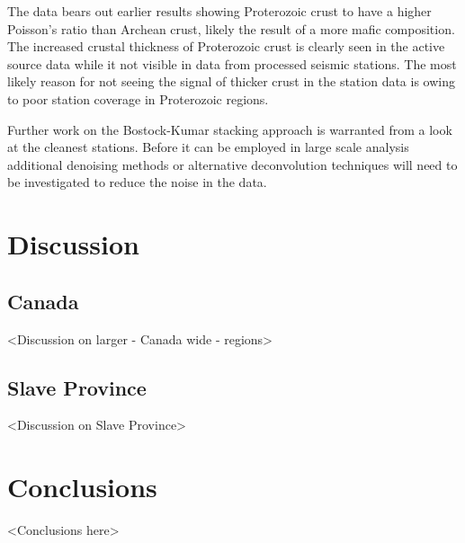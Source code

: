 \documentclass[draft]{article}
\begin{document}
  The data bears out earlier results showing Proterozoic crust to have a higher Poisson's ratio than Archean crust, likely the result of a more mafic composition. The increased crustal thickness of Proterozoic crust is clearly seen in the active source data while it not visible in data from processed seismic stations. The most likely reason for not seeing the signal of thicker crust in the station data is owing to poor station coverage in Proterozoic regions.

  Further work on the Bostock-Kumar stacking approach is warranted from a look at the cleanest stations. Before it can be employed in large scale analysis additional denoising methods or alternative deconvolution techniques will need to be investigated to reduce the noise in the data.



\section{Discussion}
\subsection{Canada}
<Discussion on larger - Canada wide - regions>
\subsection{Slave Province}
<Discussion on Slave Province>

\section{Conclusions}
<Conclusions here>




\begin{thebibliography}{}


\end{thebibliography}


\end{document}
